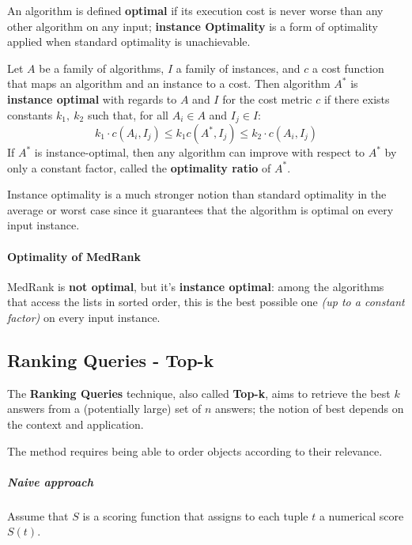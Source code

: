 \documentclass[english]{article}
\begin{document}
An algorithm is defined \textbf{optimal} if its execution cost is never worse than any other algorithm on any input;
\textbf{instance Optimality} is a form of optimality applied when standard optimality is unachievable.

Let \(A\) be a family of algorithms, \(I\) a family of instances, and \(c\) a cost function that maps an algorithm and an instance to a cost.
Then algorithm \(A^\ast\) is \textbf{instance optimal} with regards to \(A\) and \(I\) for the cost metric \(c\) if there exists constants \(k_1, \ k_2\) such that, for all \(A_i \in A\) and \(I_j \in I\):
\[ k_1 \cdot c\left( A_i, I_j \right) \leq k_1 c\left( A^\ast, I_j \right) \leq k_2 \cdot c\left( A_i, I_j \right) \]
If \(A^\ast\) is instance-optimal, then any algorithm can improve with respect to \(A^\ast\) by only a constant factor, called the \textbf{optimality ratio} of \(A^\ast\).

Instance optimality is a much stronger notion than standard optimality in the average or worst case since it guarantees that the algorithm is optimal on every input instance.

\paragraph{Optimality of MedRank}

MedRank is \textbf{not optimal}, but it's \textbf{instance optimal}:
among the algorithms that access the lists in sorted order, this is the best possible one \textit{(up to a constant factor)} on every input instance.

\subsection{Ranking Queries - Top-k}

The \textbf{Ranking Queries} technique, also called \textbf{Top-k}, aims to retrieve the best \(k\) answers from a (potentially large) set of \(n\) answers;
the notion of best depends on the context and application.

The method requires being able to order objects according to their relevance.

\subparagraph*{Naive approach}
Assume that \(S\) is a scoring function that assigns to each tuple \(t\) a numerical score \(S(t)\).
\end{document}
